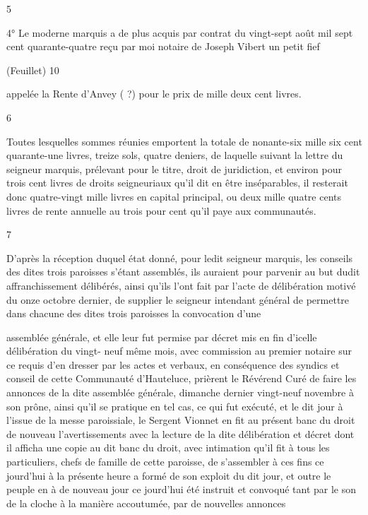 \documentclass[a4paper,twoside,openany]{article}
\begin{document}
\begin{center}
5
\end{center}
4° Le moderne marquis a de plus acquis par contrat
 du vingt-sept août mil sept cent quarante-quatre
reçu par moi notaire de Joseph Vibert un petit fief


\begin{flushright}
(Feuillet) 10
\end{flushright}		
appelée la Rente d’Anvey ( ?) pour le prix de mille
 deux cent livres.

\begin{center}
6
\end{center}
Toutes lesquelles sommes réunies emportent la
 totale de nonante-six mille six cent quarante-une 
livres, treize sols, quatre deniers, de laquelle suivant 
la lettre du seigneur marquis, prélevant pour le 
titre, droit de juridiction, et environ pour trois 
cent livres de droits seigneuriaux qu’il dit en 
être inséparables, il resterait donc quatre-vingt 
mille livres en capital principal, ou deux mille 
quatre cents livres de rente annuelle au trois pour 
cent qu’il paye aux communautés.

\begin{center}
7
\end{center}
D’après la réception duquel état donné, pour
ledit seigneur marquis, les conseils des dites trois 
paroisses s’étant assemblés, ils auraient pour 
parvenir au but dudit affranchissement délibérés, 
ainsi qu’ils l’ont fait par l’acte de délibération 
motivé du onze octobre dernier, de supplier le 
seigneur intendant général de permettre dans chacune 
des dites trois paroisses la convocation d’une


assemblée générale, et elle leur fut permise par
décret mis en fin d’icelle délibération du vingt-
neuf même mois, avec commission au premier notaire
sur ce requis d’en dresser par les actes et verbaux,
en conséquence des syndics et conseil de cette Communauté
d’Hauteluce, prièrent le Révérend Curé de faire les
annonces de la dite assemblée générale, dimanche
dernier vingt-neuf novembre à son prône, ainsi
qu’il se pratique en tel cas, ce qui fut exécuté, et
le dit jour à l’issue de la messe paroissiale, le
Sergent Vionnet  en fit au présent banc du droit
de nouveau l’avertissements avec la lecture de la
dite délibération et décret dont il afficha une copie
au dit banc du droit, avec intimation qu’il fit à
tous les particuliers, chefs de famille de cette
paroisse, de s’assembler à ces fins ce jourd’hui à
la présente heure a formé de son exploit du dit jour,
et outre le peuple en à de nouveau jour ce jourd’hui été
instruit et convoqué tant par le son de la cloche
à la manière accoutumée, par de nouvelles annonces
\end{document}
